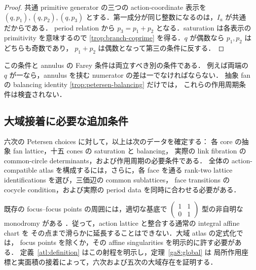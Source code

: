 \begin{proof}
共通 primitive generator の三つの action-coordinate 表示を
$(q,p_1),(q,p_2),(q,p_3)$ とする．第一成分が同じ整数になるのは，$I_a$ が共通だからである．
period relation から $p_3=p_1+p_2$ となる．saturation は各表示の primitivity を意味するので
\eqref{trop:branch-coprime} を得る．$q$ が偶数なら $p_1,p_2$ はどちらも奇数であり，
$p_1+p_2$ は偶数となって第三の条件に反する．
\end{proof}

この条件と annulus の Farey 条件は両立すべき別の条件である．
例えば両端の $q$ が一なら，annulus を挟む numerator の差は一でなければならない．
抽象 fan の balancing identity \eqref{trop:petersen-balancing} だけでは，
これらの作用周期条件は検査されない．

\subsection{大域接着に必要な追加条件}

六次の Petersen choices に対して，以上は次のデータを確定する：
各 core の抽象 fan lattice，十五 cones の saturation と balancing，
実際の link fibration の common-circle determinants，および作用周期の必要条件である．
全体の action-compatible atlas を構成するには，さらに，各 face を通る
rank-two lattice identifications を選び，三価辺の common sublattices，
face transitions の cocycle condition，および実際の period data を同時に合わせる必要がある．

既存の focus--focus points の周囲には，適切な基底で
$\left(\begin{smallmatrix}1&1\\0&1\end{smallmatrix}\right)$ 型の非自明な monodromy がある
\cite{Evans,VuNgoc}．従って，action lattice と整合する通常の integral affine chart を
その点まで滑らかに延長することはできない．大域 atlas の定式化では，
focus points を除くか，その affine singularities を明示的に許す必要がある．
定義~\ref{atl:definition} はこの射程を明示し，定理~\ref{ga8:global} は
局所作用座標と実面積の接着によって，六次および五次の大域存在を証明する．

